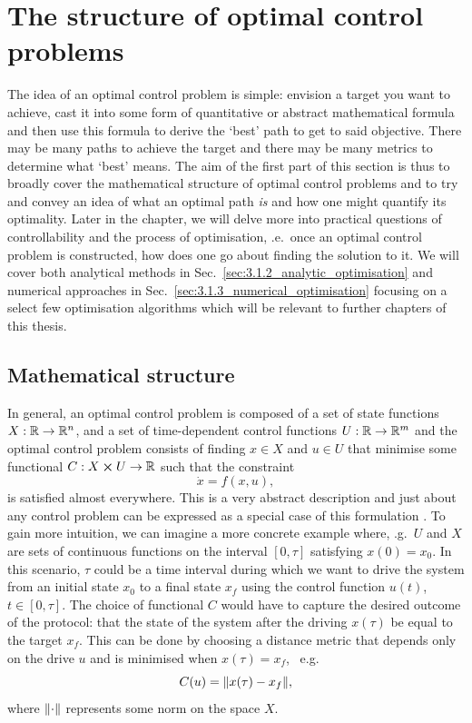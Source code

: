 \section{The structure of optimal control problems}\label{sec:3.1_structure_quantum_control}

The idea of an optimal control problem is simple: envision a target you want to achieve, cast it into some form of quantitative or abstract mathematical formula and then use this formula to derive the `best' path to get to said objective. There may be many paths to achieve the target and there may be many metrics to determine what `best' means. The aim of the first part of this section is thus to broadly cover the mathematical structure of optimal control problems and to try and convey an idea of what an optimal path \emph{is} and how one might quantify its optimality. Later in the chapter, we will delve more into practical questions of controllability and the process of optimisation, \@i.e.~once an optimal control problem is constructed, how does one go about finding the solution to it. We will cover both analytical methods in Sec.~\ref{sec:3.1.2_analytic_optimisation} and numerical approaches in Sec.~\ref{sec:3.1.3_numerical_optimisation} focusing on a select few optimisation algorithms which will be relevant to further chapters of this thesis. 

\subsection{Mathematical structure}\label{sec:3.1.1_mathematical_structure}

In general, an optimal control problem is composed of a set of state functions $X: \mathbb{R} \rightarrow \mathbb{R}^n$, and a set of time-dependent control functions $U:\mathbb{R} \rightarrow \mathbb{R}^m$ and the optimal control problem consists of finding $x \in X$ and $u \in U$ that minimise some functional $C: X \cross U \rightarrow \mathbb{R}$ such that the constraint
\begin{equation}\label{eq:control_ODE}
    \dot{x} = f(x, u),
\end{equation}
is satisfied almost everywhere. This is a very abstract description and just about any control problem can be expressed as a special case of this formulation \cite{dalessandro_introduction_2021}. To gain more intuition, we can imagine a more concrete example where, \@e.g.~$U$ and $X$ are sets of continuous functions on the interval $[0, \tau]$ satisfying $x(0) = x_0$. In this scenario, $\tau$ could be a time interval during which we want to drive the system from an initial state $x_0$ to a final state $x_f$ using the control function $u(t)$, $t \in [0, \tau]$. The choice of functional $C$ would have to capture the desired outcome of the protocol: that the state of the system after the driving $x(\tau)$ be equal to the target $x_f$. This can be done by choosing a distance metric that depends only on the drive $u$ and is minimised when $x(\tau) = x_f$, \@~e.g.
\begin{equation}\label{eq:example_cost_func}
    C(u) = \norm{x(\tau)  - x_f},
\end{equation}
where $\norm{\cdot}$ represents some norm on the space $X$.

